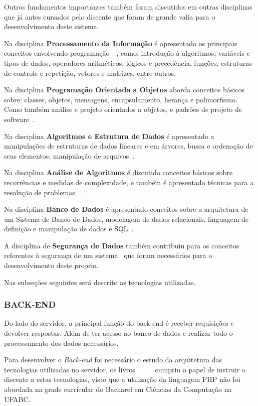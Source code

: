 \documentclass[
  12pt,				%
  openany,
  oneside,
  a4paper,			%
  english,			%
  brazil
]{article}
\numberwithin{figure}{section}
\numberwithin{table}{section}
\begin{document}
Outros fundamentos importantes também foram discutidos em outras disciplinas que já antes cursados pelo discente que foram de grande valia para o desenvolvimento deste sistema.

Na disciplina \textbf{Processamento da Informação} é apresentado os principais conceitos envolvendo programação~\cite{BCC1}~\cite{BCC2}, como: introdução à algoritmos, variáveis e tipos de dados, operadores aritméticos, lógicos e precedência, funções, estruturas de controle e repetição, vetores e matrizes, entre outros.

Na disciplina \textbf{Programação Orientada a Objetos} aborda conceitos básicos sobre: classes, objetos, mensagens, encapsulamento, herança e polimorfismo. Como também análise e projeto orientados a objetos, e padrões de projeto de software~\cite{POO_deitel}.

Na disciplina \textbf{Algoritmos e Estrutura de Dados} é apresentado a  manipulações de estruturas de dados lineares e em árvores, busca e ordenação de seus elementos, manipulação de arquivos~\cite{AED_cormen1}.

Na disciplina \textbf{Análise de Algoritmos} é discutido conceitos básicos sobre recorrências e medidas de complexidade, e também é apresentado técnicas para a resolução de problemas~\cite{AED_cormen1}~\cite{AED_cormen2}.

Na disciplina \textbf{Banco de Dados} é apresentado conceitos sobre a arquitetura de um Sistema de Banco de Dados, modelagem de dados relacionais, linguagem de definição e manipulação de dados e SQL~\cite{BD}.

A disciplina de \textbf{Segurança de Dados} também contribuiu para os conceitos referentes à segurança de um sistema~\cite{SegDados} que foram necessários para o desenvolvimento deste projeto.

Nas subseções seguintes será descrito as tecnologias utilizadas.

\subsubsection{BACK-END}
Do lado do servidor, a principal função do back-end é receber requisições e devolver respostas. Além de ter acesso ao banco de dados e realizar todo o processamento dos dados necessários.

Para desenvolver o \textit{Back-end} foi necessário o estudo da arquitetura das tecnologias utilizadas no servidor, os livros~\cite{PHP_Novatec_poo}~\cite{PHP_Novatec_dev}~\cite{PHP_Novatec_appWeb}~\cite{PHP_mysql}~\cite{PHP_Novatec_ajax} cumpriu o papel de instruir o discente a estas tecnologias, visto que a utilização da linguagem PHP não foi abordada na grade curricular do Bacharel em Ciências da Computação na UFABC.
\end{document}
